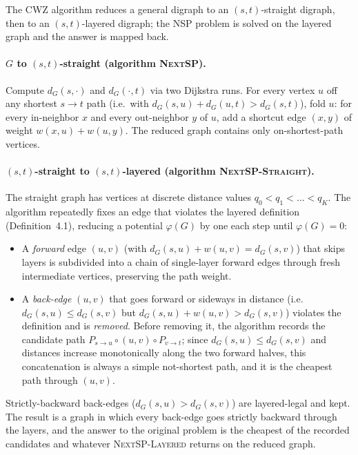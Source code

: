 The CWZ algorithm reduces a general digraph to an $(s,t)$-straight digraph,
then to an $(s,t)$-layered digraph; the NSP problem is solved on the
layered graph and the answer is mapped back.

\paragraph{$G$ to $(s,t)$-straight (algorithm \textsc{NextSP}).}
Compute $d_G(s,\cdot)$ and $d_G(\cdot,t)$ via two Dijkstra runs. For every
vertex $u$ off any shortest $s\to t$ path (i.e.~with
$d_G(s,u)+d_G(u,t)>d_G(s,t)$), fold $u$: for every in-neighbor $x$ and
every out-neighbor $y$ of $u$, add a shortcut edge $(x,y)$ of weight
$w(x,u)+w(u,y)$. The reduced graph contains only on-shortest-path vertices.

\paragraph{$(s,t)$-straight to $(s,t)$-layered (algorithm
\textsc{NextSP-Straight}).} The straight graph has vertices at discrete
distance values $q_0<q_1<\dots<q_K$. The algorithm repeatedly fixes an
edge that violates the layered definition (Definition~4.1), reducing a
potential $\varphi(G)$ by one each step until $\varphi(G)=0$:
\begin{itemize}
  \item A \emph{forward} edge $(u,v)$ (with $d_G(s,u)+w(u,v)=d_G(s,v)$)
    that skips layers is subdivided into a chain of single-layer forward
    edges through fresh intermediate vertices, preserving the path
    weight.
  \item A \emph{back-edge} $(u,v)$ that goes forward or sideways in
    distance (i.e.~$d_G(s,u)\le d_G(s,v)$ but
    $d_G(s,u)+w(u,v)>d_G(s,v)$) violates the definition and is
    \emph{removed}. Before removing it, the algorithm records the
    candidate path $P_{s\to u}\circ(u,v)\circ P_{v\to t}$; since
    $d_G(s,u)\le d_G(s,v)$ and distances increase monotonically along
    the two forward halves, this concatenation is always a simple
    not-shortest path, and it is the cheapest path through $(u,v)$.
\end{itemize}
Strictly-backward back-edges ($d_G(s,u)>d_G(s,v)$) are layered-legal and
kept. The result is a graph in which every back-edge goes strictly
backward through the layers, and the answer to the original problem is
the cheapest of the recorded candidates and whatever
\textsc{NextSP-Layered} returns on the reduced graph.

